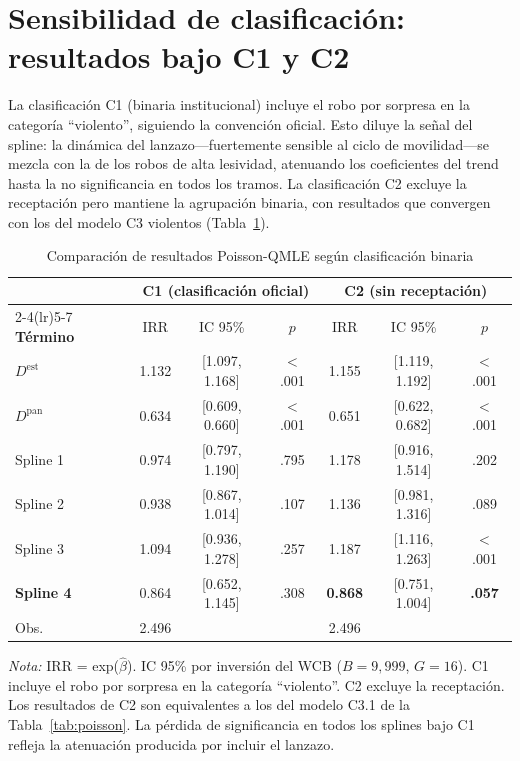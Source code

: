\documentclass[12pt,a4paper]{article}
\newcommand{\tablenote}[1]{%
  \vspace{2pt}%
  \begin{minipage}{\linewidth}%
    \footnotesize\textit{Nota:} #1%
  \end{minipage}%
}
\begin{document}
\newpage
\appendix

\section{Sensibilidad de clasificaci\'on: resultados bajo C1 y C2}
\label{ap:clasif}

La clasificaci\'on C1 (binaria institucional) incluye el robo por sorpresa
en la categor\'ia ``violento'', siguiendo la convenci\'on oficial. Esto diluye la
se\~nal del spline: la din\'amica del lanzazo---fuertemente sensible al ciclo de
movilidad---se mezcla con la de los robos de alta lesividad, atenuando los coeficientes
del trend hasta la no significancia en todos los tramos. La clasificaci\'on C2 excluye
la receptaci\'on pero mantiene la agrupaci\'on binaria, con resultados que convergen
con los del modelo C3 violentos (Tabla~\ref{tab:clasif}).

\begin{table}[H]
\centering
\caption{Comparaci\'on de resultados Poisson-QMLE seg\'un clasificaci\'on binaria}
\label{tab:clasif}
\footnotesize
\begin{tabular}{l@{\hskip 3mm}ccc@{\hskip 4mm}ccc}
\toprule
 & \multicolumn{3}{c}{\textbf{C1 (clasificaci\'on oficial)}} &
   \multicolumn{3}{c}{\textbf{C2 (sin receptaci\'on)}} \\
\cmidrule(lr){2-4}\cmidrule(lr){5-7}
\textbf{T\'ermino} & IRR & IC 95\% & $p$ & IRR & IC 95\% & $p$ \\
\midrule
$D^{\text{est}}$ & 1.132 & [1.097, 1.168] & $<$.001 & 1.155 & [1.119, 1.192] & $<$.001 \\
$D^{\text{pan}}$ & 0.634 & [0.609, 0.660] & $<$.001 & 0.651 & [0.622, 0.682] & $<$.001 \\
\midrule
Spline 1 & 0.974 & [0.797, 1.190] & .795 & 1.178 & [0.916, 1.514] & .202 \\
Spline 2 & 0.938 & [0.867, 1.014] & .107 & 1.136 & [0.981, 1.316] & .089 \\
Spline 3 & 1.094 & [0.936, 1.278] & .257 & 1.187 & [1.116, 1.263] & $<$.001 \\
\textbf{Spline 4} & 0.864 & [0.652, 1.145] & .308 & \textbf{0.868} & [0.751, 1.004] & \textbf{.057} \\
\midrule
Obs. & 2.496 & & & 2.496 & & \\
\bottomrule
\end{tabular}
\tablenote{IRR = exp($\hat{\beta}$). IC 95\% por inversi\'on del WCB ($B=9{,}999$,
$G=16$). C1 incluye el robo por sorpresa en la categor\'ia ``violento''. C2 excluye la receptaci\'on.
Los resultados de C2 son equivalentes a los del modelo C3.1 de la
Tabla~\ref{tab:poisson}. La p\'erdida de significancia en todos los splines bajo C1
refleja la atenuaci\'on producida por incluir el lanzazo.}
\end{table}
\end{document}
